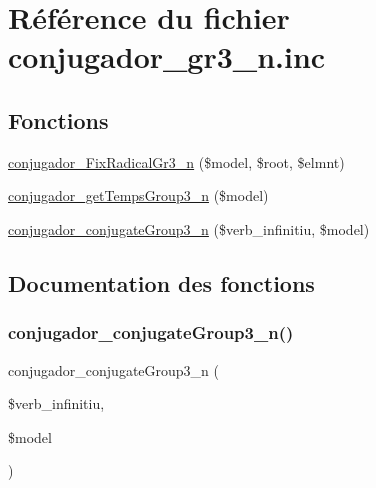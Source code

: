 \hypertarget{conjugador__gr3__n_8inc}{}\section{Référence du fichier conjugador\+\_\+gr3\+\_\+n.\+inc}
\label{conjugador__gr3__n_8inc}
\subsection*{Fonctions}
\begin{DoxyCompactItemize}
\item 
\hyperlink{conjugador__gr3__n_8inc_a8b5eb99580509e77514f575acb094396}{conjugador\+\_\+\+Fix\+Radical\+Gr3\+\_\+n} (\$model, \$root, \$elmnt)
\item 
\hyperlink{conjugador__gr3__n_8inc_a3dfa66bbf35eab81453e7b9f5882de50}{conjugador\+\_\+get\+Temps\+Group3\+\_\+n} (\$model)
\item 
\hyperlink{conjugador__gr3__n_8inc_a177f50afff0c22645daeb42029708d45}{conjugador\+\_\+conjugate\+Group3\+\_\+n} (\$verb\+\_\+infinitiu, \$model)
\end{DoxyCompactItemize}


\subsection{Documentation des fonctions}
\hypertarget{conjugador__gr3__n_8inc_a177f50afff0c22645daeb42029708d45}{}\label{conjugador__gr3__n_8inc_a177f50afff0c22645daeb42029708d45} 
\subsubsection{\texorpdfstring{conjugador\+\_\+conjugate\+Group3\+\_\+n()}{conjugador\_conjugateGroup3\_n()}}
{\footnotesize\ttfamily conjugador\+\_\+conjugate\+Group3\+\_\+n (\begin{DoxyParamCaption}\item[{}]{\$verb\+\_\+infinitiu,  }\item[{}]{\$model }\end{DoxyParamCaption})}

\hypertarget{conjugador__gr3__n_8inc_a8b5eb99580509e77514f575acb094396}{}\label{conjugador__gr3__n_8inc_a8b5eb99580509e77514f575acb094396} 
